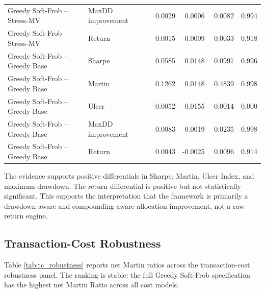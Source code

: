 \documentclass[11pt]{article}
\begin{document}
\begin{table}[h!]
{\begin{tabular}{llrrrr}
Greedy Soft-Frob -- Stress-MV & MaxDD improvement & 0.0029 & 0.0006 & 0.0082 & 0.994 \\
Greedy Soft-Frob -- Stress-MV & Return & 0.0015 & -0.0009 & 0.0033 & 0.918 \\
\midrule
Greedy Soft-Frob -- Greedy Base & Sharpe & 0.0585 & 0.0148 & 0.0997 & 0.996 \\
Greedy Soft-Frob -- Greedy Base & Martin & 0.1262 & 0.0148 & 0.4839 & 0.998 \\
Greedy Soft-Frob -- Greedy Base & Ulcer & -0.0052 & -0.0155 & -0.0014 & 0.000 \\
Greedy Soft-Frob -- Greedy Base & MaxDD improvement & 0.0083 & 0.0019 & 0.0235 & 0.998 \\
Greedy Soft-Frob -- Greedy Base & Return & 0.0043 & -0.0025 & 0.0096 & 0.914 \\
\bottomrule
\end{tabular}}
\end{table}

The evidence supports positive differentials in Sharpe, Martin, Ulcer Index, and maximum drawdown. The return differential is positive but not statistically significant. This supports the interpretation that the framework is primarily a drawdown-aware and compounding-aware allocation improvement, not a raw-return engine.

\subsection{Transaction-Cost Robustness}

Table \ref{tab:tc_robustness} reports net Martin ratios across the transaction-cost robustness panel. The ranking is stable: the full Greedy Soft-Frob specification has the highest net Martin Ratio across all cost models.

\begin{table}[h!]
\centering
\caption{Transaction-cost robustness: final-test net Martin ratios}
\label{tab:tc_robustness}
\end{table}
\end{document}
